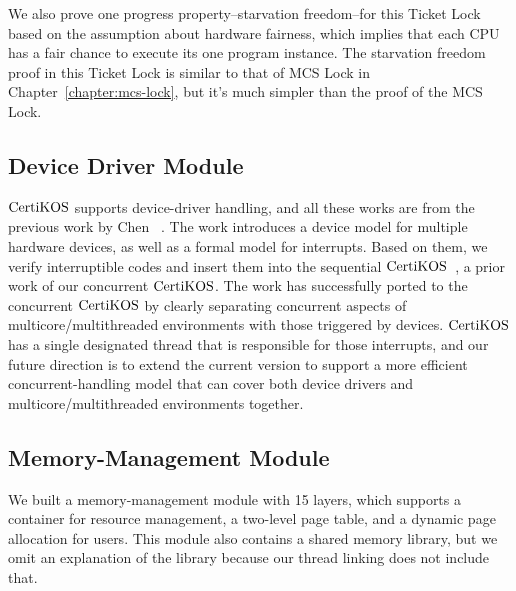 We also prove one progress property--starvation freedom--for this Ticket Lock based on the assumption about hardware fairness,
which implies that each CPU has a fair chance to execute its one program instance.
The starvation freedom proof in this Ticket Lock is 
similar to that of  MCS Lock in Chapter~\ref{chapter:mcs-lock}, but 
it's much simpler than the proof of the MCS Lock.

\subsection{Device Driver Module}
\label{chapter:certikos:subsec:device-driver-module}

$\mathrm{CertiKOS}$ supports device-driver handling, and all these works are from the previous work by  Chen \etal~\cite{certikos:interrupt}.
The work introduces a device model for multiple hardware devices,
as well as a formal model for interrupts. 
Based on them, we verify interruptible codes and insert them into the sequential $\mathrm{CertiKOS}$~\cite{deepspec}, a prior work of our concurrent $\mathrm{CertiKOS}$. 
The work has  successfully ported to the concurrent $\mathrm{CertiKOS}$
by clearly separating  concurrent aspects of multicore/multithreaded environments
with those triggered by devices.
$\mathrm{CertiKOS}$ has a single designated thread that is responsible for those interrupts,
and our future direction is to extend the current version to support a more efficient concurrent-handling model that can cover both device drivers and multicore/multithreaded environments together.

\subsection{Memory-Management Module}
\label{chapter:certikos:subsec:memory-management-module}

We built a memory-management module with 15 layers, 
which supports a container for resource management, a two-level page table, and a dynamic page allocation for users.
This module also contains a shared memory library,
but we omit an explanation of the library because our thread linking does not include that. 

